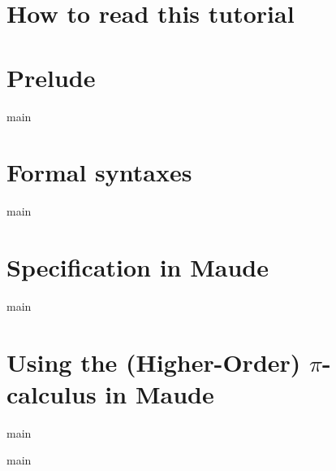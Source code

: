 \documentclass{article}
\begin{document}
\listoftodos

\maketitle

\newpage
\tableofcontents
\newpage

\section*{How to read this tutorial}


\newpage
\section{Prelude}
{main}


\newpage
\section{Formal syntaxes}
\label{formsyn}
{main}

\newpage
\section{Specification in Maude}
\label{using}
{main}

\newpage
\section{Using the (Higher-Order) \texorpdfstring{$\pi$}{pi}-calculus in Maude}
{main}

\newpage

\newpage

\newpage
\appendix
\newpage
{main}
\end{document}
